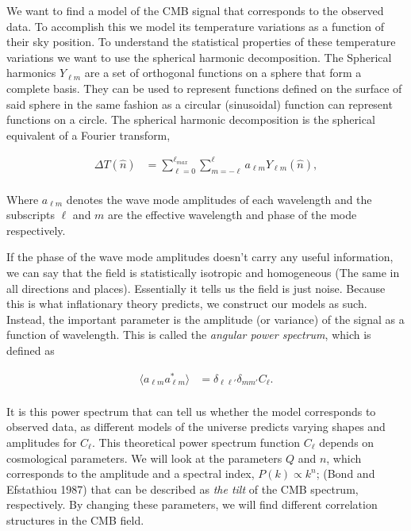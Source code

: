 \documentclass{emulateapj}
\begin{document}
\vspace{5mm}
We want to find a model of the CMB signal that corresponds to the observed data. To accomplish this we model its temperature variations as a function of their sky position. To understand the statistical properties of these temperature variations we want to use the spherical harmonic decomposition. The Spherical harmonics $Y_{\ell m}$ are a set of orthogonal functions on a sphere that form a complete basis. They can be used to represent functions defined on the surface of said sphere in the same fashion as a circular (sinusoidal) function can represent functions on a circle. The spherical harmonic decomposition is the spherical equivalent of a Fourier transform,

 \begin{equation}
 \label{dTn}
 \begin{array}{rl}
 \Delta T(\hat{n})  &= \sum_{\ell = 0}^{\ell_{max}} \sum_{m = -\ell}^{\ell} a_{\ell m}Y_{\ell m}(\hat{n}),\\
 \end{array}
 \end{equation}

\noindent
Where $a_{\ell m}$ denotes the wave mode amplitudes of each wavelength and the subscripts $\ell$ and $m$ are the effective wavelength and phase of the mode respectively. 

If the phase of the wave mode amplitudes doesn't carry any useful information, we can say that the field is statistically isotropic and homogeneous (The same in all directions and places). Essentially it tells us the field is just noise. Because this is what inflationary theory predicts, we construct our models as such. Instead, the important parameter is the amplitude (or variance) of the signal as a function of wavelength. This is called the \textit{angular power spectrum}, which is defined as

 \begin{equation}
 \label{angular_power_spec}
 \begin{array}{rl}
 \langle a_{\ell m}a_{\ell m}^*\rangle  &= \delta_{\ell \ell'}\delta_{mm'}C_{\ell}.\\
 \end{array}
 \end{equation}

\noindent 
It is this power spectrum that can tell us whether the model corresponds to observed data, %
as different models of the universe predicts varying shapes and
amplitudes for $C_{\ell}$.
This theoretical power spectrum function $C_{\ell}$ depends on cosmological parameters. We will look at the parameters $Q$ and $n$, which corresponds to the amplitude and a spectral index, $P(k) \propto k^n$; (Bond and Efstathiou 1987) that can be described as \textit{the tilt} of the CMB spectrum, respectively. By changing these parameters, we will find different correlation structures in the CMB field.
\end{document}
